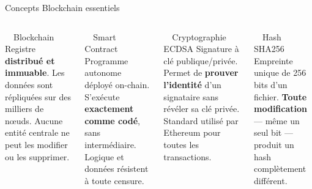 \documentclass[aspectratio=169]{beamer}
\begin{document}
\begin{frame}{Concepts Blockchain essentiels}

  \begin{columns}[T]

      \begin{block}{\faLink\ \ Blockchain}
        Registre \textbf{distribué et immuable}. Les données sont
        répliquées sur des milliers de nœuds. Aucune entité centrale
        ne peut les modifier ou les supprimer.
      \end{block}

      \vspace{0.3cm}

      \begin{block}{\faFileCode\ \ Smart Contract}
        Programme autonome déployé on-chain. S'exécute \textbf{exactement
        comme codé}, sans intermédiaire. Logique et données résistent
        à toute censure.
      \end{block}


      \begin{block}{\faKey\ \ Cryptographie ECDSA}
        Signature à clé publique/privée. Permet de \textbf{prouver
        l'identité} d'un signataire sans révéler sa clé privée.
        Standard utilisé par Ethereum pour toutes les transactions.
      \end{block}

      \vspace{0.3cm}

      \begin{block}{\faHashtag\ \ Hash SHA256}
        Empreinte unique de 256 bits d'un fichier.
        \textbf{Toute modification} — même un seul bit — produit
        un hash complètement différent.
      \end{block}

  \end{columns}

\end{frame}
\end{document}
